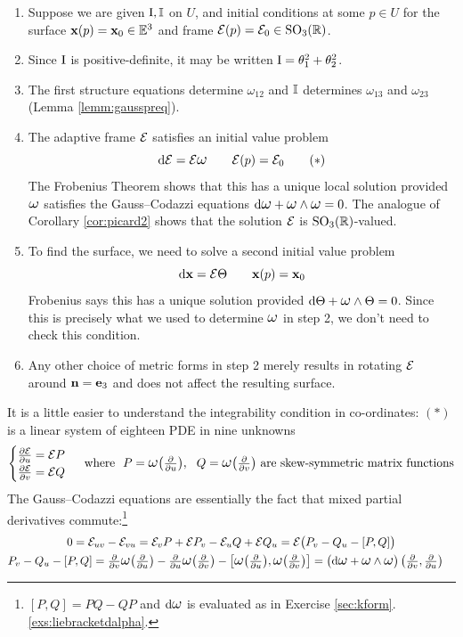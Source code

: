 \begin{enumerate}
  \item Suppose we are given $\mathrm{I},\mathbb{I}$ on $U$, and initial conditions at some $p\in U$ for the surface ${\mathbf{x}}(p)={\mathbf{x}}_0\in\mathbb{E}^3$ and frame $\mathcal{E}(p)=\mathcal{E}_0\in\mathrm{SO}_3(\mathbb{R})$.
  \item Since $\mathrm{I}$ is positive-definite, it may be written $\mathrm{I}=\theta_1^2+\theta_2^2$.
  \item The first structure equations determine $\omega_{12}$ and $\mathbb{I}$ determines $\omega_{13}$ and $\omega_{23}$ (Lemma \ref{lemm:gausspreq}).
  \item The adaptive frame $\mathcal{E}$ satisfies an initial value problem
  \[%
  \D\cE=\cE\lomega\qquad
  \cE(p)=\cE_0
  \tag{$\ast$}\]
  The Frobenius Theorem shows that this has a unique local solution provided $\lomega$ satisfies the Gauss--Codazzi equations $\D\lomega+\lomega\wedge\lomega=0$. The analogue of Corollary \ref{cor:picard2} shows that the solution $\mathcal{E}$ is $\mathrm{SO}_3(\mathbb{R})$-valued.
  \item To find the surface, we need to solve a second initial value problem
 	\[%
  \dvx=\cE\Theta\qquad
  \vx(p)=\vx_0
  \]
  Frobenius says this has a unique solution provided $\D\Theta+\lomega\wedge\Theta=0$. Since this is precisely what we used to determine $\lomega$ in step 2, we don't need to check this condition.
  \item Any other choice of metric forms in step 2 merely results in rotating $\mathcal{E}$ around ${\mathbf{n}}={\mathbf{e}}_3$ and does not affect the resulting surface.
\end{enumerate}

It is a little easier to understand the integrability condition in co-ordinates: $(\ast)$ is a linear system of eighteen PDE in nine unknowns
\[\begin{cases}
\partials[\cE]{u}=\cE P\\
\partials[\cE]{v}=\cE Q
\end{cases}
\ \text{where }\ 
P=\lomega\bigl(\textstyle\partials u\bigr),\ \ Q=\lomega\bigl(\textstyle\partials v\bigr) \text{ are skew-symmetric matrix functions}\]
The Gauss--Codazzi equations are essentially the fact that mixed partial derivatives commute:\footnote{$[P,Q]=PQ-QP$ and $\D\lomega$ is evaluated as in Exercise \ref{sec:kform}.\ref{exs:liebracketdalpha}.}
\begin{gather*}
0=\cE_{uv}-\cE_{vu}=\cE_vP+\cE P_v- \cE_uQ+\cE Q_u=\cE\bigl(P_v-Q_u-[P,Q]\bigr)\\
\begin{aligned}
P_v-Q_u-[P,Q]&=\textstyle\partials v\lomega\bigl(\partials u\bigr)-\partials u\lomega\bigl(\partials v\bigr)-\bigl[\lomega\bigl(\partials u\bigr),\lomega\bigl(\partials v\bigr)\bigr] =\bigl(\D\lomega+\lomega\wedge\lomega\bigr)\left(\partials v,\partials u\right)
\end{aligned}
\end{gather*}

